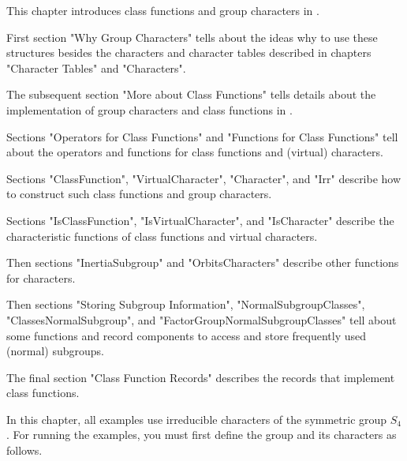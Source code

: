 
This chapter introduces class functions and group characters in {\GAP}.

First section "Why Group Characters" tells about the ideas
why to use these structures besides the characters and character tables
described in chapters "Character Tables" and "Characters".

The subsequent section "More about Class Functions" tells details about
the implementation of group characters and class functions in {\GAP}.

Sections "Operators for Class Functions" and "Functions for Class Functions"
tell about the operators and functions for class functions and (virtual)
characters.

Sections "ClassFunction", "VirtualCharacter", "Character", and "Irr"
describe how to construct such class functions and group characters.

Sections "IsClassFunction", "IsVirtualCharacter", and "IsCharacter"
describe the characteristic functions of class functions and virtual
characters.

Then sections "InertiaSubgroup" and "OrbitsCharacters" describe other
functions for characters.

Then sections "Storing Subgroup Information", "NormalSubgroupClasses",
"ClassesNormalSubgroup", and "FactorGroupNormalSubgroupClasses" tell
about some functions and record components to access and store frequently
used (normal) subgroups.

The final section "Class Function Records" describes the records that
implement class functions.

\vspace{3mm}

In this chapter, all examples use irreducible characters of the
symmetric group $S_4$.  For running the examples, you must first
define the group and its characters as follows.

